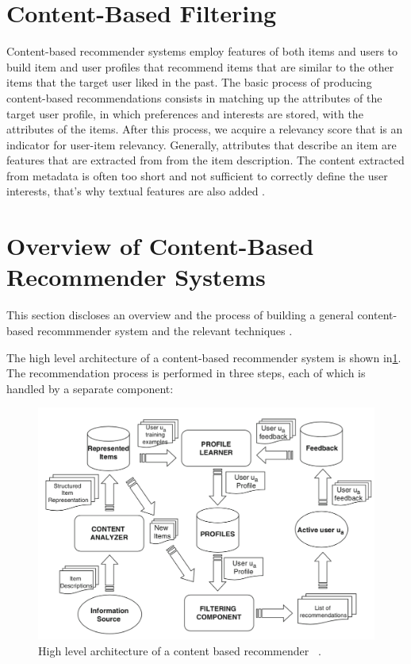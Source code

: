 
\section{Content-Based Filtering}\label{section:content_based_filtering}

Content-based recommender systems employ features of both items and users to build item and user profiles that recommend  items that are similar to the other items that the target user liked in the past. The basic process of producing content-based recommendations consists in matching up the attributes of the target user profile, in which preferences and interests are stored, with the attributes of the items. After this process, we acquire a relevancy score that is an indicator for user-item relevancy. Generally, attributes that describe an item are features that are extracted from from the item description. The content extracted from metadata is often too short and not sufficient to correctly define the user interests, that's why textual features are also added \cite{de2015semantics}.

\section{Overview of Content-Based Recommender Systems}

This section discloses an overview and the process of building a general content-based recommmender system and the relevant techniques \cite{de2015semantics}.

The high level architecture of a content-based recommender system is shown in\ref{fig:high-level-content-based}. The recommendation process is performed in three steps, each of which is handled by a separate component:

 \begin{figure}[!ht]
	\centering
	\includegraphics[width=\textwidth]{figures/HighLevelContentBased.png}
	\caption{High level architecture of a content based recommender  ~\parencite{de2015semantics}.}
	\label{fig:high-level-content-based}
\end{figure}



